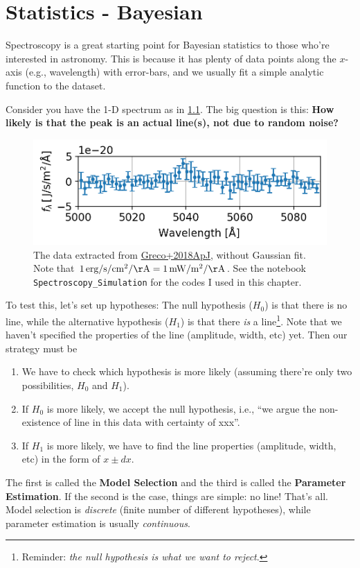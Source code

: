 \chapter{Statistics - Bayesian}

Spectroscopy is a great starting point for Bayesian statistics to those who're interested in astronomy. This is because it has plenty of data points along the $ x $-axis (e.g., wavelength) with error-bars, and we usually fit a simple analytic function to the dataset. 

Consider you have the 1-D spectrum as in \cref{fig:greco2018f2-rep}. The big question is this: \textbf{How likely is that the peak is an actual line(s), not due to random noise?}
\begin{figure}[ht!]
  \centering
  \includegraphics[width=0.6\linewidth]{figs/Greco2018F2-rep}
  \caption{The data extracted from \href{https://ui.adsabs.harvard.edu/abs/2018ApJ...866..112G/abstract}{Greco+2018ApJ}, without Gaussian fit. Note that $ 1 \,\mathrm{erg/s/cm^2/\AA} = 1 \, \mathrm{mW/m^2/\AA} $. See the notebook \texttt{Spectroscopy\_Simulation} for the codes I used in this chapter.}
  \label{fig:greco2018f2-rep}
\end{figure}


To test this, let's set up hypotheses: The null hypothesis ($H_0$) is that there is no line, while the alternative hypothesis ($H_1$) is that there \textit{is} a line\footnote{Reminder: \textit{the null hypothesis is what we want to reject}.}. Note that we haven't specified the properties of the line (amplitude, width, etc) yet. Then our strategy must be
\begin{enumerate}
\item We have to check which hypothesis is more likely (assuming there're only two possibilities, $ H_0 $ and $ H_1 $).
\item If $H_0$ is more likely, we accept the null hypothesis, i.e., ``we argue the non-existence of line in this data with certainty of xxx''.
\item If $H_1$ is more likely, we have to find the line properties (amplitude, width, etc) in the form of $ x \pm dx $.
\end{enumerate}
The first is called the \textbf{Model Selection} and the third is called the \textbf{Parameter Estimation}. If the second is the case, things are simple: no line! That's all. Model selection is \textit{discrete} (finite number of different hypotheses), while parameter estimation is usually \textit{continuous}.

